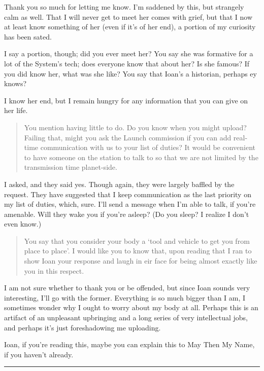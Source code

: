 \noindent Thank you so much for letting me know. I'm saddened by this, but strangely calm as well. That I will never get to meet her comes with grief, but that I now at least know something of her (even if it's of her end), a portion of my curiosity has been sated.

I say a portion, though; did you ever meet her? You say she was formative for a lot of the System's tech; does everyone know that about her? Is she famous? If you did know her, what was she like? You say that Ioan's a historian, perhaps ey knows?

I know her end, but I remain hungry for any information that you can give on her life.

\begin{quote}
You mention having little to do. Do you know when you might upload? Failing that, might you ask the Launch commission if you can add real-time communication with us to your list of duties? It would be convenient to have someone on the station to talk to so that we are not limited by the transmission time planet-side.
\end{quote}

\noindent I asked, and they said yes. Though again, they were largely baffled by the request. They have suggested that I keep communication as the last priority on my list of duties, which, sure. I'll send a message when I'm able to talk, if you're amenable. Will they wake you if you're asleep? (Do you sleep? I realize I don't even know.)

\begin{quote}
You say that you consider your body a `tool and vehicle to get you from place to place'. I would like you to know that, upon reading that I ran to show Ioan your response and laugh in eir face for being almost exactly like you in this respect.
\end{quote}

\noindent I am not sure whether to thank you or be offended, but since Ioan sounds very interesting, I'll go with the former. Everything is so much bigger than I am, I sometimes wonder why I ought to worry about my body at all. Perhaps this is an artifact of an unpleasant upbringing and a long series of very intellectual jobs, and perhaps it's just foreshadowing me uploading.

Ioan, if you're reading this, maybe you can explain this to May Then My Name, if you haven't already.

\begin{center}\rule{0.5\linewidth}{0.5pt}\end{center}

